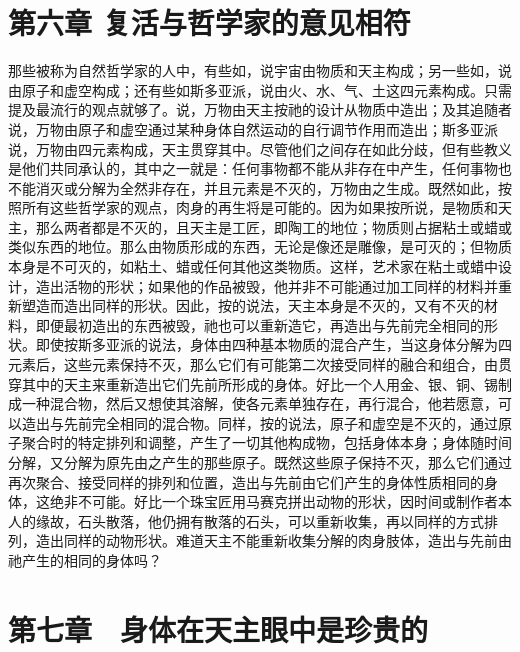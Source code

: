 
\section{第六章 复活与哲学家的意见相符}

那些被称为自然哲学家的人中，有些如，说宇宙由物质和天主构成；另一些如，说由原子和虚空构成；还有些如斯多亚派，说由火、水、气、土这四元素构成。只需提及最流行的观点就够了。说，万物由天主按祂的设计从物质中造出；及其追随者说，万物由原子和虚空通过某种身体自然运动的自行调节作用而造出；斯多亚派说，万物由四元素构成，天主贯穿其中。尽管他们之间存在如此分歧，但有些教义是他们共同承认的，其中之一就是：任何事物都不能从非存在中产生，任何事物也不能消灭或分解为全然非存在，并且元素是不灭的，万物由之生成。既然如此，按照所有这些哲学家的观点，肉身的再生将是可能的。因为如果按所说，是物质和天主，那么两者都是不灭的，且天主是工匠，即陶工的地位；物质则占据粘土或蜡或类似东西的地位。那么由物质形成的东西，无论是像还是雕像，是可灭的；但物质本身是不可灭的，如粘土、蜡或任何其他这类物质。这样，艺术家在粘土或蜡中设计，造出活物的形状；如果他的作品被毁，他并非不可能通过加工同样的材料并重新塑造而造出同样的形状。因此，按的说法，天主本身是不灭的，又有不灭的材料，即便最初造出的东西被毁，祂也可以重新造它，再造出与先前完全相同的形状。即使按斯多亚派的说法，身体由四种基本物质的混合产生，当这身体分解为四元素后，这些元素保持不灭，那么它们有可能第二次接受同样的融合和组合，由贯穿其中的天主来重新造出它们先前所形成的身体。好比一个人用金、银、铜、锡制成一种混合物，然后又想使其溶解，使各元素单独存在，再行混合，他若愿意，可以造出与先前完全相同的混合物。同样，按的说法，原子和虚空是不灭的，通过原子聚合时的特定排列和调整，产生了一切其他构成物，包括身体本身；身体随时间分解，又分解为原先由之产生的那些原子。既然这些原子保持不灭，那么它们通过再次聚合、接受同样的排列和位置，造出与先前由它们产生的身体性质相同的身体，这绝非不可能。好比一个珠宝匠用马赛克拼出动物的形状，因时间或制作者本人的缘故，石头散落，他仍拥有散落的石头，可以重新收集，再以同样的方式排列，造出同样的动物形状。难道天主不能重新收集分解的肉身肢体，造出与先前由祂产生的相同的身体吗？\par


\section{第七章　身体在天主眼中是珍贵的}

